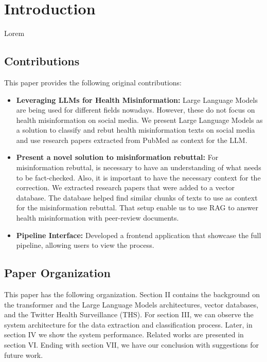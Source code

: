 
\section{Introduction}
Lorem 

\subsection{Contributions}
This paper provides the following original contributions:
\begin{itemize}
	\item{\textbf{Leveraging LLMs for Health Misinformation:}} Large Language Models are being used for different fields nowadays. However, these do not focus on health misinformation on social media. We present Large Language Models as a solution to classify and rebut health misinformation texts on social media and use research papers extracted from PubMed as context for the LLM.
	\item{\textbf{Present a novel solution to misinformation rebuttal:}} For misinformation rebuttal, is necessary to have an understanding of what needs to be fact-checked. Also, it is important to have the necessary context for the correction. We extracted research papers that were added to a vector database. The database helped find similar chunks of texts to use as context for the misinformation rebuttal. That setup enable us to use RAG to answer health misinformation with peer-review documents.
	\item{\textbf{Pipeline Interface:}} Developed a frontend application that showcase the full pipeline, allowing users to view the process.

\end{itemize}


\subsection{Paper Organization}
This paper has the following organization. Section II contains the background on the transformer and the Large Language Models architectures, vector databases, and the Twitter Health Surveillance (THS). For section III, we can observe the system architecture for the data extraction and classification process. Later, in section IV we show the system performance. Related works are presented in section VI. Ending with section VII, we have our conclusion with suggestions for future work.
